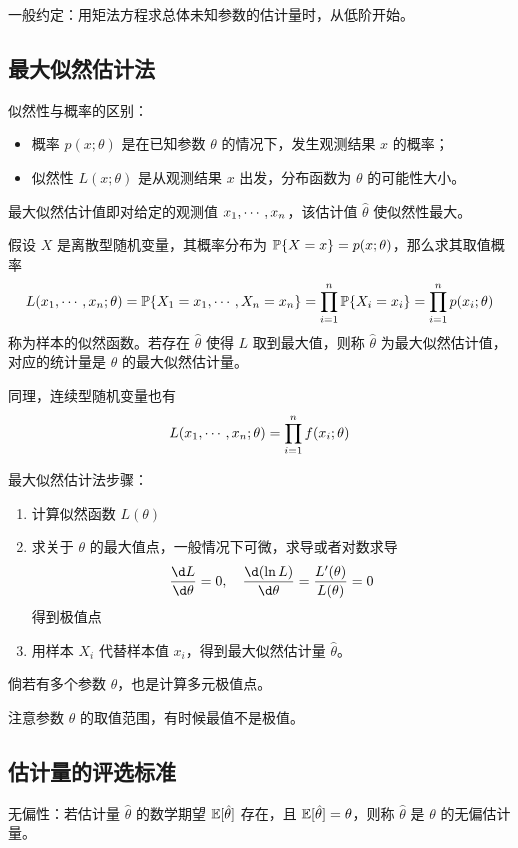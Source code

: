 一般约定：用矩法方程求总体未知参数的估计量时，从低阶开始。

\subsection{最大似然估计法}

似然性与概率的区别：
\begin{itemize}
	\item 概率 $p(x;\theta)$ 是在已知参数 $\theta$ 的情况下，发生观测结果 $x$ 的概率；
	\item 似然性 $L(x; \theta)$ 是从观测结果 $x$ 出发，分布函数为 $\theta$ 的可能性大小。
\end{itemize}

最大似然估计值即对给定的观测值 $x_1,\cdots,x_n$，该估计值 $\hat{\theta}$ 使似然性最大。

假设 $X$ 是离散型随机变量，其概率分布为 $\mathbb{P}\{X = x\} = p(x; \theta)$，那么求其取值概率
\[ L(x_1,\cdots,x_n;\theta) = \mathbb{P}\{X_1 = x_1, \cdots, X_n = x_n\} = \prod_{i=1}^n \mathbb{P}\{X_i=x_i\} = \prod_{i=1}^n p(x_i; \theta) \]
称为样本的似然函数。若存在 $\hat{\theta}$ 使得 $L$ 取到最大值，则称 $\hat{\theta}$ 为最大似然估计值，对应的统计量是 $\theta$ 的最大似然估计量。

同理，连续型随机变量也有
\[ L(x_1,\cdots,x_n; \theta) = \prod_{i=1}^n f(x_i; \theta) \]

最大似然估计法步骤：
\begin{enumerate}
	\item 计算似然函数 $L(\theta)$
	\item 求关于 $\theta$ 的最大值点，一般情况下可微，求导或者对数求导
	      \[ \frac{\d L}{\d \theta} = 0, \quad \frac{\d (\ln L)}{\d \theta} = \frac{L'(\theta)}{L(\theta)} = 0 \]
	      得到极值点
	\item 用样本 $X_i$ 代替样本值 $x_i$，得到最大似然估计量 $\hat{\theta}$。
\end{enumerate}
倘若有多个参数 $\theta$，也是计算多元极值点。

\begin{note}
	注意参数 $\theta$ 的取值范围，有时候最值不是极值。
\end{note}

\subsection{估计量的评选标准}

无偏性：若估计量 $\hat{\theta}$ 的数学期望 $\mathbb{E}[\hat{\theta}]$ 存在，且 $\mathbb{E}[\hat{\theta}] = \theta$，则称 $\hat{\theta}$ 是 $\theta$ 的无偏估计量。

